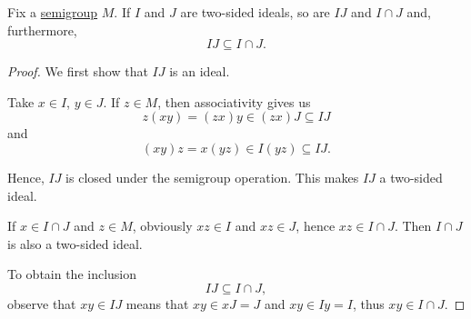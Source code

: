 \begin{proposition}\label{thm:product_of_semigroup_ideals_is_in_intersection}
  Fix a \hyperref[def:magma/associative]{semigroup} \( M \). If \( I \) and \( J \) are two-sided ideals, so are \( IJ \) and \( I \cap J \) and, furthermore,
  \begin{equation*}
    IJ \subseteq I \cap J.
  \end{equation*}
\end{proposition}
\begin{proof}
  We first show that \( IJ \) is an ideal.

  Take \( x \in I \), \( y \in J \). If \( z \in M \), then associativity gives us
  \begin{equation*}
    z(xy) = (zx)y \in (zx)J \subseteq IJ
  \end{equation*}
  and
  \begin{equation*}
    (xy)z = x(yz) \in I(yz) \subseteq IJ.
  \end{equation*}

  Hence, \( IJ \) is closed under the semigroup operation. This makes \( IJ \) a two-sided ideal.

  If \( x \in I \cap J \) and \( z \in M \), obviously \( xz \in I \) and \( xz \in J \), hence \( xz \in I \cap J \). Then \( I \cap J \) is also a two-sided ideal.

  To obtain the inclusion
  \begin{equation*}
    IJ \subseteq I \cap J,
  \end{equation*}
  observe that \( xy \in IJ \) means that \( xy \in xJ = J \) and \( xy \in Iy = I \), thus \( xy \in I \cap J \).
\end{proof}

